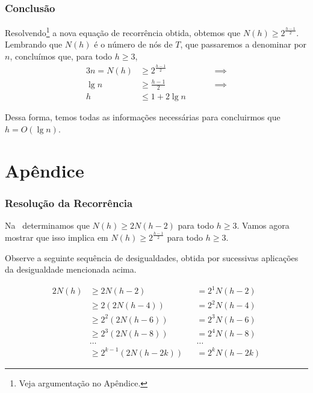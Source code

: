\documentclass[10pt,a4paper,twoside]{article}
\theoremstyle{definition}
\begin{document}
    \section{Conclusão}

     Resolvendo\footnote{Veja argumentação no Apêndice.} a nova equação de recorrência obtida, obtemos que \( N(h) \geq 2^{\frac{h-1}{2}} \). Lembrando que \( N(h) \) é o número de nós de \( T \), que passaremos a denominar por \( n \), concluímos que, para todo \( h \geq 3 \),
     \begin{alignat*}{3}
       n = N(h) & \geq 2^{\frac{h-1}{2}} & \quad &  & \implies \\
       \lg n    & \geq \frac{h-1}{2}     & \quad &  & \implies \\
       h        & \leq 1 + 2 \lg n       & \quad &  &
     \end{alignat*}

     Dessa forma, temos todas as informações necessárias para concluirmos que \( h = O(\lg n) \).

  \part*{Apêndice}

    \section{Resolução da Recorrência}

     Na~ determinamos que \( N(h) \geq 2N(h-2) \) para todo \( h \geq 3 \). Vamos agora mostrar que isso implica em \( N(h) \geq 2^{\frac{h-1}{2}} \) para todo \( h \geq 3 \).

     Observe a seguinte sequência de desigualdades, obtida por sucessivas aplicações da desigualdade mencionada acima.

     \begin{alignat*}{2}
       N(h) & \geq 2N(h-2)           &  & = 2^1 N(h-2)  \\
            & \geq 2(2N(h-4))        &  & = 2^2 N(h-4)  \\
            & \geq 2^2(2N(h-6))      &  & = 2^3 N(h-6)  \\
            & \geq 2^3(2N(h-8))      &  & = 2^4 N(h-8)  \\
            & \dots                  &  & \dots         \\
            & \geq 2^{k-1}(2N(h-2k)) &  & = 2^k N(h-2k)
     \end{alignat*}
\end{document}
